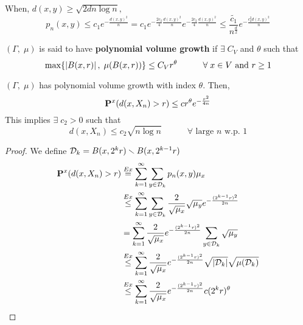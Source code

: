 \documentclass[main]{subfiles}
\begin{document}
When, $d(x,y) \geq \sqrt{2dn\log n},$
\[p_n(x,y) \leq c_1 e^{-\frac{d(x,y)^2}{n}} = c_1 e^{-\frac{2c_2}{4}\frac{d(x,y)^2}{n}} e^{-\frac{2c_2}{4}\frac{d(x,y)^2}{n}} \leq \frac{\widetilde{c_1}}{n^\frac{d}{2}} e^{-\frac{c_2^2d(x,y)^2}{n}}\]
\begin{definition}
	$(\Gamma,\;\mu)$ is said to have \textbf{polynomial volume growth} if $\exists\;C_V$ and $\theta$ such that
	\[\max\{\Mod{B(x,r)},\;\mu(B(x,r))\} \leq C_Vr^\theta \hspace{3em} \forall\;x \in V\text{ and }r \geq 1\]
\end{definition}
\begin{lemma}
	$(\Gamma,\;\mu)$ has polynomial volume growth with index $\theta.$ Then,
	\[\P^x(d(x, X_n) > r) \leq cr^\theta e^{-\frac{r^2}{4n}}\]
	This implies $\exists\;c_2>0$ such that
	\[d(x, X_n) \leq c_2 \sqrt{n\log n} \hspace{3em} \forall\text{ large }n\text{ w.p. }1\]
	\begin{proof}
		We define $\SD_k = B(x,2^kr) \smallsetminus B(x,2^{k-1}r)$
		\begin{align*}
			\P^x(d(x, X_n) > r) & \stackrel{Ex}{=} \sum_{k=1}^\infty \sum_{y \in \SD_k} p_n(x,y)\mu_x                                                           \\
			                    & \stackrel{Ex}{\leq} \sum_{k=1}^\infty \sum_{y \in \SD_k} \frac{2}{\sqrt{\mu_x}}\sqrt{\mu_y}e^{-\frac{(2^{k-1}r)^2}{2n}}       \\
			                    & = \sum_{k=1}^\infty \frac{2}{\sqrt{\mu_x}} e^{-\frac{(2^{k-1}r)^2}{2n}} \sum_{y \in \SD_k} \sqrt{\mu_y}                       \\
			                    & \stackrel{Ex}{\leq} \sum_{k=1}^\infty \frac{2}{\sqrt{\mu_x}} e^{-\frac{(2^{k-1}r)^2}{2n}} \sqrt{\Mod{\SD_k}}\sqrt{\mu(\SD_k)} \\
			                    & \stackrel{Ex}{\leq} \sum_{k=1}^\infty \frac{2}{\sqrt{\mu_x}} e^{-\frac{(2^{k-1}r)^2}{2n}} c(2^kr)^\theta                      \\
		\end{align*}
	\end{proof}
\end{lemma}
\end{document}

